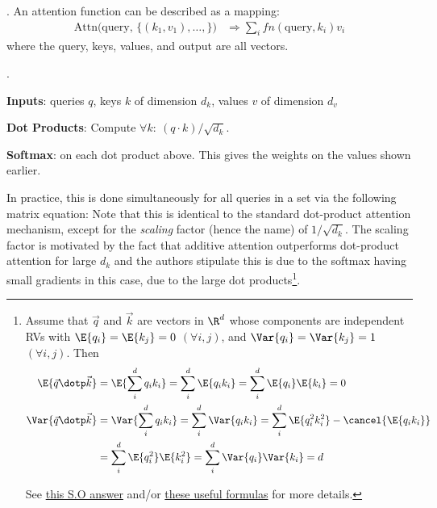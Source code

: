\documentclass[11pt]{article}
\begin{document}
\myspace
\p {}. An attention function can be described as a mapping:
\begin{align}
\text{Attn(query, }\{(k_1, v_1), \ldots, \}\text{)} 
&\Rightarrow \sum_i fn(\text{query}, k_i) v_i
\end{align}
where the query, keys, values, and output are all vectors. 
\begin{compactitem}
	\item {}.
	\begin{compactenum}
		\item \textbf{Inputs}: queries $q$, keys $k$ of dimension $d_k$, values $v$ of dimension $d_v$
		\item \textbf{Dot Products}: Compute $\forall k:~ (q \cdot k) / \sqrt{d_k}$. 
		\item \textbf{Softmax}: on each dot product above. This gives the weights on the values shown earlier.
	\end{compactenum}
	In practice, this is done simultaneously for all queries in a set via the following matrix equation:
	Note that this is identical to the standard dot-product attention mechanism, except for the \textit{scaling} factor (hence the name) of $1/\sqrt{d_k}$. The scaling factor is motivated by the fact that additive attention outperforms dot-product attention for large $d_k$ and the authors stipulate this is due to the softmax having small gradients in this case, due to the large dot products\footnote{
		Assume that $\vec q$ and $\vec k$ are vectors in $\R^d$ whose components are independent RVs with $\E{q_i} = \E{k_j} = 0$ $(\forall i, j)$, and $\Var{q_i} = \Var{k_j} = 1$ $(\forall i, j)$. Then
		\begin{align}
		\E{\vec q \dotp \vec k}
		&= \E{\sum_i^d q_i k_i} 
		= \sum_i^d \E{q_i k_i} 
		= \sum_i^d \E{q_i} \E{k_i} 
		= 0 \\
		\Var{\vec q \dotp \vec k}
		&= \Var{\sum_i^d q_i k_i} 
		= \sum_i^d \Var{q_i k_i} 
		= \sum_i^d \E{q_i^2 k_i^2} - \cancel{ \E{q_i k_i} } \\
		&= \sum_i^d \E{q_i^2} \E{k_i^2} 
		= \sum_i^d \Var{q_i} \Var{k_i} 
		= d
		\end{align}
		
		See \href{https://stats.stackexchange.com/a/318258}{this S.O answer} and/or \href{http://www.odelama.com/data-analysis/Commonly-Used-Math-Formulas}{these useful formulas} for more details.
	}. \\
	

\end{compactitem}
\end{document}
